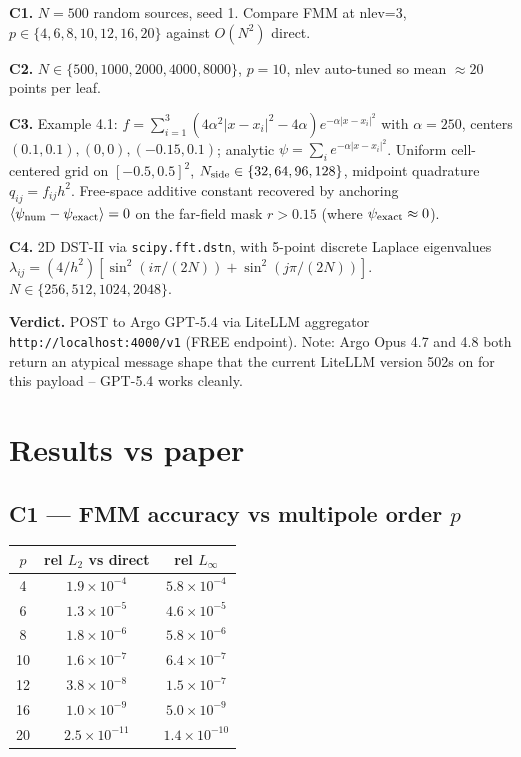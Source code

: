 \documentclass[11pt]{article}
\begin{document}
\textbf{C1.} $N=500$ random sources, seed 1. Compare FMM at nlev=3,
$p \in \{4,6,8,10,12,16,20\}$ against $O(N^2)$ direct.

\textbf{C2.} $N \in \{500, 1000, 2000, 4000, 8000\}$, $p=10$, nlev auto-tuned
so mean $\approx 20$ points per leaf.

\textbf{C3.} Example 4.1: $f = \sum_{i=1}^{3} (4\alpha^2|x-x_i|^2 - 4\alpha)
e^{-\alpha|x-x_i|^2}$ with $\alpha=250$, centers $(0.1,0.1), (0,0), (-0.15, 0.1)$;
analytic $\psi = \sum_i e^{-\alpha|x-x_i|^2}$. Uniform cell-centered grid on
$[-0.5, 0.5]^2$, $N_{\rm side} \in \{32, 64, 96, 128\}$, midpoint quadrature
$q_{ij} = f_{ij} h^2$. Free-space additive constant recovered by anchoring
$\langle \psi_{\rm num} - \psi_{\rm exact}\rangle = 0$ on the far-field mask
$r > 0.15$ (where $\psi_{\rm exact} \approx 0$).

\textbf{C4.} 2D DST-II via \texttt{scipy.fft.dstn}, with 5-point discrete
Laplace eigenvalues $\lambda_{ij} = (4/h^2)[\sin^2(i\pi/(2N)) + \sin^2(j\pi/(2N))]$.
$N \in \{256, 512, 1024, 2048\}$.

\textbf{Verdict.} POST to Argo GPT-5.4 via LiteLLM aggregator
\texttt{http://localhost:4000/v1} (FREE endpoint). Note: Argo Opus 4.7 and
4.8 both return an atypical message shape that the current LiteLLM version
502s on for this payload -- GPT-5.4 works cleanly.

\section{Results vs paper}

\subsection{C1 --- FMM accuracy vs multipole order $p$}

\begin{center}
\begin{tabular}{ccc}
\toprule
$p$ & rel $L_2$ vs direct & rel $L_\infty$ \\
\midrule
4  & $1.9\!\times\!10^{-4}$ & $5.8\!\times\!10^{-4}$ \\
6  & $1.3\!\times\!10^{-5}$ & $4.6\!\times\!10^{-5}$ \\
8  & $1.8\!\times\!10^{-6}$ & $5.8\!\times\!10^{-6}$ \\
10 & $1.6\!\times\!10^{-7}$ & $6.4\!\times\!10^{-7}$ \\
12 & $3.8\!\times\!10^{-8}$ & $1.5\!\times\!10^{-7}$ \\
16 & $1.0\!\times\!10^{-9}$ & $5.0\!\times\!10^{-9}$ \\
20 & $2.5\!\times\!10^{-11}$ & $1.4\!\times\!10^{-10}$ \\
\bottomrule
\end{tabular}
\end{center}
\end{document}
